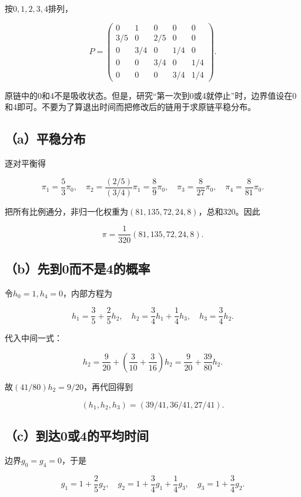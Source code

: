 \documentclass[
  11pt,a4paper,UTF8,fontset=fandol]{ctexart}
\begin{document}
按\(0,1,2,3,4\)排列，

\[
P=\begin{pmatrix}
0&1&0&0&0\\3/5&0&2/5&0&0\\0&3/4&0&1/4&0\\0&0&3/4&0&1/4\\0&0&0&3/4&1/4
\end{pmatrix}.
\]

原链中的0和4不是吸收状态。但是，研究``第一次到0或4就停止''时，边界值设在0和4即可。不要为了算退出时间而把修改后的链用于求原链平稳分布。

\subsection{（a）平稳分布}\label{aux5e73ux7a33ux5206ux5e03}

逐对平衡得

\[
\pi_1=\frac53\pi_0,\quad
\pi_2=\frac{(2/5)}{(3/4)}\pi_1=\frac89\pi_0,\quad
\pi_3=\frac8{27}\pi_0,\quad
\pi_4=\frac8{81}\pi_0.
\]

把所有比例通分，非归一化权重为\((81,135,72,24,8)\)，总和320。因此

\[
\boxed{\pi=\frac1{320}(81,135,72,24,8).}
\]

\subsection{（b）先到0而不是4的概率}\label{bux5148ux52300ux800cux4e0dux662f4ux7684ux6982ux7387}

令\(h_0=1,h_4=0\)，内部方程为

\[
h_1=\frac35+\frac25h_2,\quad h_2=\frac34h_1+\frac14h_3,\quad h_3=\frac34h_2.
\]

代入中间一式：

\[
h_2=\frac9{20}+\left(\frac3{10}+\frac3{16}\right)h_2
=\frac9{20}+\frac{39}{80}h_2.
\]

故\((41/80)h_2=9/20\)，再代回得到

\[
\boxed{(h_1,h_2,h_3)=(39/41,36/41,27/41).}
\]

\subsection{（c）到达0或4的平均时间}\label{cux5230ux8fbe0ux62164ux7684ux5e73ux5747ux65f6ux95f4}

边界\(g_0=g_4=0\)，于是

\[
g_1=1+\frac25g_2,\quad g_2=1+\frac34g_1+\frac14g_3,\quad g_3=1+\frac34g_2.
\]
\end{document}
